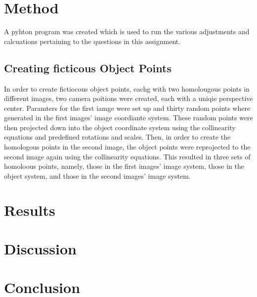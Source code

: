 \documentclass{article}
\begin{document}
\section{Method}
A pyhton program was created which is used to run the various adjustments and calcuations pertaining to the questions 
in this assignment.

\subsection{Creating ficticous Object Points}
In order to create fictiocous object points, eachg with two homolougous points in different images, 
two camera poitions were created, each with a uniqie perspective center. 
Paramters for the first iamge were set up and thirty random points where generated in the first images' image coordiante system. 
These random points were then projected down into the object coordinate system using the collinearity equations and 
predefined rotations and scales. Then, in order to create the homologous points in the second image, the object points were 
reprojected to the second image again using the collinearity equations. 
This resulted in three sets of homoloous points, namely, those in the first images' image system, those in the object system, 
and those in the second images' image system.


\section{Results}

\section{Discussion}

\section{Conclusion}
\end{document}
